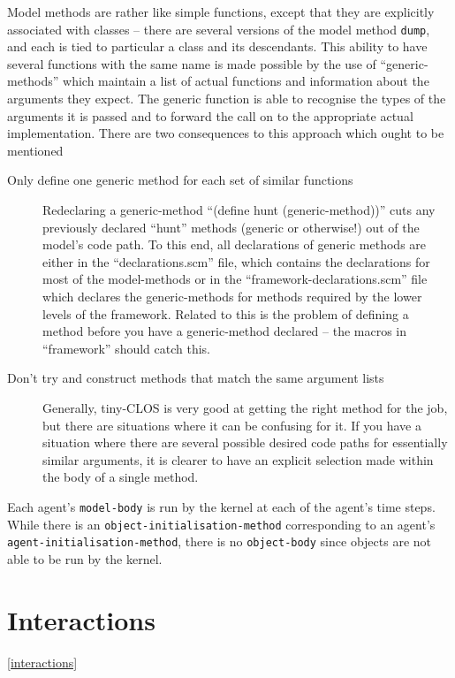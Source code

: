 Model methods are rather like simple functions, except that they are
explicitly associated with classes -- there are several versions of
the model method \texttt{dump}, and each is tied to particular a class
and its descendants.  This ability to have several functions with the same
name is made possible by the use of ``generic-methods'' which
maintain a list of actual functions and information about the
arguments they expect.  The generic function is able to 
recognise the types of the arguments it is passed and to forward the
call on to the appropriate actual implementation.  There are two
consequences to this approach which ought to be mentioned
\begin{description}
  \item[Only define one generic method for each set of similar
    functions] Redeclaring a generic-method ``(define hunt
    (generic-method))'' cuts any previously declared ``hunt'' methods
    (generic or otherwise!) out of the model's code path. To this end,
    all declarations of generic methods are either in the
    ``declarations.scm'' file, which contains the declarations for
    most of the model-methods or in the ``framework-declarations.scm''
    file which declares the generic-methods for methods required by
    the lower levels of the framework.  Related to this is the problem
    of defining a method before you have a generic-method declared --
    the macros in ``framework'' should catch this.
  \item[Don't try and construct methods that match the same argument
    lists] Generally, tiny-CLOS is very good at getting the right
    method for the job, but there are situations where it can be
    confusing for it.  If you have a situation where there are several
    possible desired code paths for essentially similar arguments, it
    is clearer to have an explicit selection made within the body of a
    single method.
\end{description}
 
Each agent's \texttt{model-body} is run by the kernel at each of the
agent's time steps. While there is an
\texttt{object-initialisation-method} corresponding to an agent's
\texttt{agent-initialisation-method}, there is no \texttt{object-body}
since objects are not able to be run by the kernel.

\section{Interactions}\ref{interactions}

